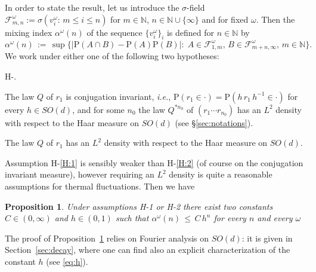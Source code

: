 \documentclass[a4paper,reqno,11pt]{amsart}
\numberwithin{equation}{section}
\newtheorem{proposition}[theorem]{Proposition}
\newcommand{\cF}{{\ensuremath{\mathcal F}} }
\newcommand{\ga}{\alpha}
\newcommand{\gs}{\sigma}
\newcommand{\go}{\omega}
\newcommand{\N}{\mathbb{N}}
\def\bP{\ensuremath{\bs{\mathrm{P}}}}
\def\bs{\boldsymbol}
\begin{document}
In order to state the result, let us introduce the
$\gs$-field $\cF_{m,n}^\go := \gs
(v_i^\go:\, m \le i \le n)$
for $m\in \N$, $n \in \N \cup \{\infty\}$ and for fixed $\go$.
Then the mixing index $\ga^\go (n)$ of the sequence $\{ v_i^\go\}_i$
is defined for $n\in\N$ by
\begin{equation}
    \ga^\go (n) \, :=\, \sup \big\{ |\bP(A\cap B) - \bP(A)\bP(B)|:\;
    A \in \cF_{1,m}^\go, \, B\in\cF_{m+n,\infty}^\go,\, m \in \N \big\}.
\end{equation}
We work under either one of the following two hypotheses:

\smallskip
{}
\begin{list}{H-.}
   {
    }
\item  \label{H:1} The law $Q$ of $r_1$ is conjugation invariant,
{\sl i.e.}, $\bP(r_1 \in \cdot) = \bP(h\, r_1\, h^{-1} \in \cdot)$
for every $h \in SO(d)$,
and for some $n_0$ the law $Q^{*n_0}$
of $(r_1 \cdots r_{n_0})$ has an $L^2$ density with respect to the Haar measure
on $SO(d)$ (see \S\ref{sec:notations}).

\item \label{H:2}\rule{0pt}{1.2em}The law $Q$ of $r_1$
has an $L^2$ density with respect to the Haar measure on $SO(d)$.
\end{list}
\smallskip

\noindent
Assumption H-\ref{H:1} is sensibly weaker than  H-\ref{H:2}
(of course on the conjugation invariant measure),
however requiring an $L^2$ density is  quite a reasonable assumptions for thermal fluctuations.
Then we have

\medskip
\begin{proposition}
\label{th:mixing}
Under assumptions H-1 or H-2
there exist two constants
$C \in (0,\infty)$ and  $h \in (0,1)$ such that
$\alpha^\go (n) \, \le \,  C\,  h^{n}$ for every $n$ and every $\go$
\end{proposition}
\medskip

The proof of
Proposition~\ref{th:mixing} relies on Fourier analysis on $SO(d)$: it is given in
Section~\ref{sec:decay}, where one can find also an explicit characterization of the constant $ h$
(see \eqref{eq:h}).





\medskip
\end{document}
